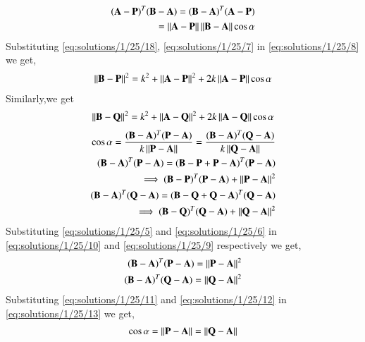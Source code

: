 \begin{align}
\begin{split}
 (\mathbf{A}-\mathbf{P})^T(\mathbf{B}-\mathbf{A})=(\mathbf{B}-\mathbf{A})^T(\mathbf{A}-\mathbf{P})\\
 = \left\lVert\mathbf{A}-\mathbf{P}\right\rVert \left\lVert\mathbf{B}-\mathbf{A}\right\rVert \cos\alpha\label{eq:solutions/1/25/18}
\end{split}
\end{align}
Substituting \eqref{eq:solutions/1/25/18}, \eqref{eq:solutions/1/25/7} in \eqref{eq:solutions/1/25/8} we get,
\begin{align}
  \begin{split}
      \left\lVert\mathbf{B}-\mathbf{P}\right\rVert^2=k^2+\left\lVert\mathbf{A}-\mathbf{P}\right\rVert^2
      +2k\left\lVert\mathbf{A}-\mathbf{P}\right\rVert\cos\alpha\label{eq:solutions/1/25/14}
  \end{split}  
\end{align}
Similarly,we get
\begin{align}
    \left\lVert\mathbf{B}-\mathbf{Q}\right\rVert^2=k^2+\left\lVert\mathbf{A}-\mathbf{Q}\right\rVert^2
      +2k\left\lVert\mathbf{A}-\mathbf{Q}\right\rVert\cos\alpha\label{eq:solutions/1/25/15}
\end{align}
\begin{align}
    \cos\alpha = \frac{(\mathbf{B}-\mathbf{A})^T(\mathbf{P}-\mathbf{A})}{k\left\lVert\mathbf{P}-\mathbf{A}\right\rVert} = \frac{(\mathbf{B}-\mathbf{A})^T(\mathbf{Q}-\mathbf{A})}{k\left\lVert\mathbf{Q}-\mathbf{A}\right\rVert}\label{eq:solutions/1/25/13}\\
    (\mathbf{B}-\mathbf{A})^T(\mathbf{P}-\mathbf{A})=(\mathbf{B}-\mathbf{P}+\mathbf{P}-\mathbf{A})^T(\mathbf{P}-\mathbf{A})\\
    \implies (\mathbf{B}-\mathbf{P})^T(\mathbf{P}-\mathbf{A}) + \left\lVert\mathbf{P}-\mathbf{A}\right\rVert^2\label{eq:solutions/1/25/9}\\
    (\mathbf{B}-\mathbf{A})^T(\mathbf{Q}-\mathbf{A})=(\mathbf{B}-\mathbf{Q}+\mathbf{Q}-\mathbf{A})^T(\mathbf{Q}-\mathbf{A})\\
     \implies (\mathbf{B}-\mathbf{Q})^T(\mathbf{Q}-\mathbf{A}) + \left\lVert\mathbf{Q}-\mathbf{A}\right\rVert^2\label{eq:solutions/1/25/10}
\end{align}
Substituting \eqref{eq:solutions/1/25/5} and \eqref{eq:solutions/1/25/6} in \eqref{eq:solutions/1/25/10} and \eqref{eq:solutions/1/25/9} respectively we get,
\begin{align}
    (\mathbf{B}-\mathbf{A})^T(\mathbf{P}-\mathbf{A})=\left\lVert\mathbf{P}-\mathbf{A}\right\rVert^2\label{eq:solutions/1/25/11}\\
    (\mathbf{B}-\mathbf{A})^T(\mathbf{Q}-\mathbf{A})=\left\lVert\mathbf{Q}-\mathbf{A}\right\rVert^2\label{eq:solutions/1/25/12}
\end{align}
Substituting \eqref{eq:solutions/1/25/11} and \eqref{eq:solutions/1/25/12} in \eqref{eq:solutions/1/25/13} we get,
\begin{align}
    \cos\alpha=\left\lVert\mathbf{P}-\mathbf{A}\right\rVert=\left\lVert\mathbf{Q}-\mathbf{A}\right\rVert\label{eq:solutions/1/25/16}
\end{align}
